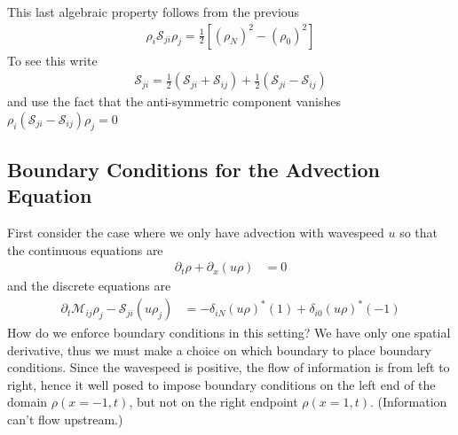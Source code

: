 \documentclass{report}
\numberwithin{equation}{section}
\begin{document}
This last algebraic property follows from the previous
\begin{align}
    \rho_i \mathcal{S}_{ji} \rho_j = \frac{1}{2} \left[ (\rho_N)^2 - (\rho_0)^2 \right]
\end{align}
To see this write 
\begin{align}
    \mathcal{S}_{ji} = \frac{1}{2}\left(\mathcal{S}_{ji} + \mathcal{S}_{ij} \right) + \frac{1}{2}\left(\mathcal{S}_{ji} - \mathcal{S}_{ij} \right)
\end{align}
and use the fact that the anti-symmetric component vanishes $ \rho_i\left(\mathcal{S}_{ji} - \mathcal{S}_{ij} \right) \rho_j = 0$

\subsection{Boundary Conditions for the Advection Equation}
\label{sec:advection_bc}

\label{advection_equations_bc}
First consider the case where we only have advection with wavespeed $u$ so that the continuous equations are
\begin{align}
\partial_t \rho + \partial_x (u\rho) &= 0
\end{align}
and the discrete equations are 
\begin{align}
    \label{discrete_form_1}
    \partial_t \mathcal{M}_{ij} \rho_j -  \mathcal{S}_{ji} (u \rho_j) &= 
    - \delta_{iN} (u\rho)^*(1) 
    +  
     \delta_{i0}(u\rho)^*(-1)
\end{align}
How do we enforce boundary conditions in this setting? We have only one spatial derivative, thus we must make a choice on which boundary to place boundary conditions. Since the wavespeed is positive, the flow of information is from left to right, hence it well posed to impose boundary conditions on the left end of the domain $\rho(x=-1, t)$, but not on the right endpoint $\rho(x = 1, t)$. (Information can't flow upstream.)
\end{document}
